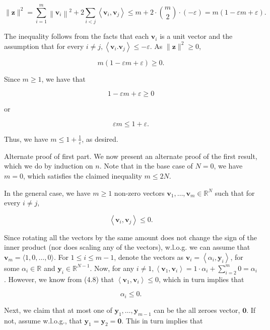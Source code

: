 \documentclass[10pt]{article}
\begin{document}
$$
\|\mathbf{z}\|^{2}=\sum_{i=1}^{m}\left\|\mathbf{v}_{i}\right\|^{2}+2 \sum_{i<j}\left\langle\mathbf{v}_{i}, \mathbf{v}_{j}\right\rangle \leq m+2 \cdot\binom{m}{2} \cdot(-\varepsilon)=m(1-\varepsilon m+\varepsilon) .
$$

The inequality follows from the facts that each $\mathbf{v}_{i}$ is a unit vector and the assumption that for every $i \neq j,\left\langle\mathbf{v}_{i} . \mathbf{v}_{j}\right\rangle \leq-\varepsilon$. As $\|\mathbf{z}\|^{2} \geq 0$,

$$
m(1-\varepsilon m+\varepsilon) \geq 0 .
$$

Since $m \geq 1$, we have that

$$
1-\varepsilon m+\varepsilon \geq 0
$$

or

$$
\varepsilon m \leq 1+\varepsilon .
$$

Thus, we have $m \leq 1+\frac{1}{\varepsilon}$, as desired.

Alternate proof of first part. We now present an alternate proof of the first result, which we do by induction on $n$. Note that in the base case of $N=0$, we have $m=0$, which satisfies the claimed inequality $m \leq 2 N$.

In the general case, we have $m \geq 1$ non-zero vectors $\mathbf{v}_{1}, \ldots, \mathbf{v}_{m} \in \mathbb{R}^{N}$ such that for every $i \neq j$,


\begin{equation*}
\left\langle\mathbf{v}_{i}, \mathbf{v}_{j}\right\rangle \leq 0 . \tag{4.8}
\end{equation*}


Since rotating all the vectors by the same amount does not change the sign of the inner product (nor does scaling any of the vectors), w.l.o.g. we can assume that $\mathbf{v}_{m}=\langle 1,0, \ldots, 0\rangle$. For $1 \leq i \leq m-1$, denote the vectors as $\mathbf{v}_{i}=\left\langle\alpha_{i}, \mathbf{y}_{i}\right\rangle$, for some $\alpha_{i} \in \mathbb{R}$ and $\mathbf{y}_{i} \in \mathbb{R}^{N-1}$. Now, for any $i \neq 1,\left\langle\mathbf{v}_{1}, \mathbf{v}_{i}\right\rangle=1 \cdot \alpha_{i}+\sum_{i=2}^{m} 0=\alpha_{i}$. However, we know from (4.8) that $\left\langle\mathbf{v}_{1}, \mathbf{v}_{i}\right\rangle \leq 0$, which in turn implies that


\begin{equation*}
\alpha_{i} \leq 0 . \tag{4.9}
\end{equation*}


Next, we claim that at most one of $\mathbf{y}_{1}, \ldots, \mathbf{y}_{m-1}$ can be the all zeroes vector, $\mathbf{0}$. If not, assume w.l.o.g., that $\mathbf{y}_{1}=\mathbf{y}_{2}=\mathbf{0}$. This in turn implies that
\end{document}
